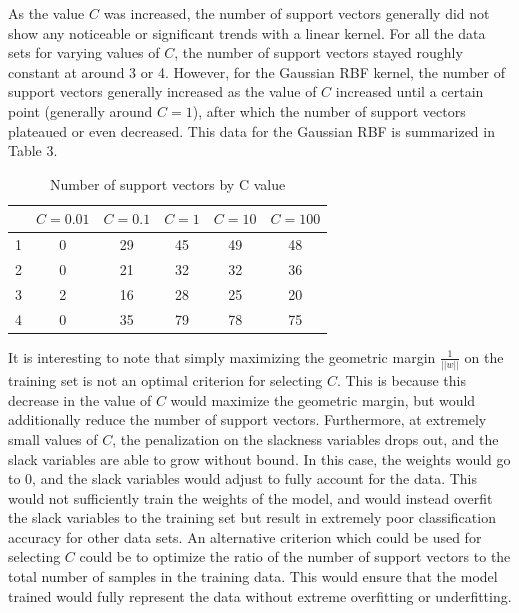 \documentclass{article}
\begin{document}
As the value $C$ was increased, the number of support vectors generally did not show any noticeable or significant trends with a linear kernel. For all the data sets for varying values of $C$, the number of support vectors stayed roughly constant at around 3 or 4. However, for the Gaussian RBF kernel, the number of support vectors generally increased as the value of $C$ increased until a certain point (generally around $C=1$), after which the number of support vectors plateaued or even decreased. This data for the Gaussian RBF is summarized in Table 3.

\begin{table}
  \begin{center}
    \begin{tabular}{ | c | c | c | c | c | c | }
      \hline
              & $C=0.01$ & $C=0.1$ & $C=1$ & $C=10$ & $C=100$ \\ \hline
      1       & 0        & 29      & 45    & 49     & 48      \\ \hline
      2       & 0        & 21      & 32    & 32     & 36      \\ \hline
      3       & 2        & 16      & 28    & 25     & 20      \\ \hline
      4       & 0        & 35      & 79    & 78     & 75      \\ \hline
    \end{tabular}
  \end{center}
  \caption{Number of support vectors by C value}
\end{table}

It is interesting to note that simply maximizing the geometric margin $\frac{1}{||w||}$ on the training set is not an optimal criterion for selecting $C$. This is because this decrease in the value of $C$ would maximize the geometric margin, but would additionally reduce the number of support vectors. Furthermore, at extremely small values of $C$, the penalization on the slackness variables drops out, and the slack variables are able to grow without bound. In this case, the weights would go to 0, and the slack variables would adjust to fully account for the data. This would not sufficiently train the weights of the model, and would instead overfit the slack variables to the training set but result in extremely poor classification accuracy for other data sets. An alternative criterion which could be used for selecting $C$ could be to optimize the ratio of the number of support vectors to the total number of samples in the training data. This would ensure that the model trained would fully represent the data without extreme overfitting or underfitting.
\end{document}
